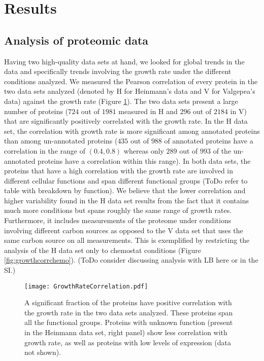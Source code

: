 \documentclass[notitlepage]{article}
\begin{document}
\section{Results}
\subsection{Analysis of proteomic data}
Having two high-quality data sets at hand, we looked for global trends in the data and specifically trends involving the growth rate under the different conditions analyzed.
We measured the Pearson correlation of every protein in the two data sets analyzed (denoted by H for Heinmann's data and V for Valgepea's data) against the growth rate (Figure \ref{fig:growthcorr}).
The two data sets present a large number of proteins ($724$ out of $1981$ measured in H and $296$ out of $2184$ in V) that are significantly positively correlated with the growth rate.
In the H data set, the correlation with growth rate is more significant among annotated proteins than among un-annotated proteins ($435$ out of $988$ of annotated proteins have a correlation in the range of $(0.4,0.8)$ whereas only $289$ out of $993$ of the un-annotated proteins have a correlation within this range).
In both data sets, the proteins that have a high correlation with the growth rate are involved in different cellular functions and span different functional groups (ToDo refer to table with breakdown by function).
We believe that the lower correlation and higher variability found in the H data set results from the fact that it contains much more conditions but spans roughly the same range of growth rates.
Furthermore, it includes measurements of the proteome under conditions involving different carbon sources as opposed to the V data set that uses the same carbon source on all measurements.
This is exemplified by restricting the analysis of the H data set only to chemostat conditions (Figure \ref{fig:growthcorrchemo}).
(ToDo consider discussing analysis with LB here or in the SI.)

\begin{figure}[h]
\centering
\texttt{[image: GrowthRateCorrelation.pdf]}
\caption{
A significant fraction of the proteins have positive correlation with the growth rate in the two data sets analyzed.
These proteins span all the functional groups.
Proteins with unknown function (present in the Heinmann data set, right panel) show less correlation with growth rate, as well as proteins with low levels of expression (data not shown).
}
\label{fig:growthcorr}
\end{figure}
\end{document}
